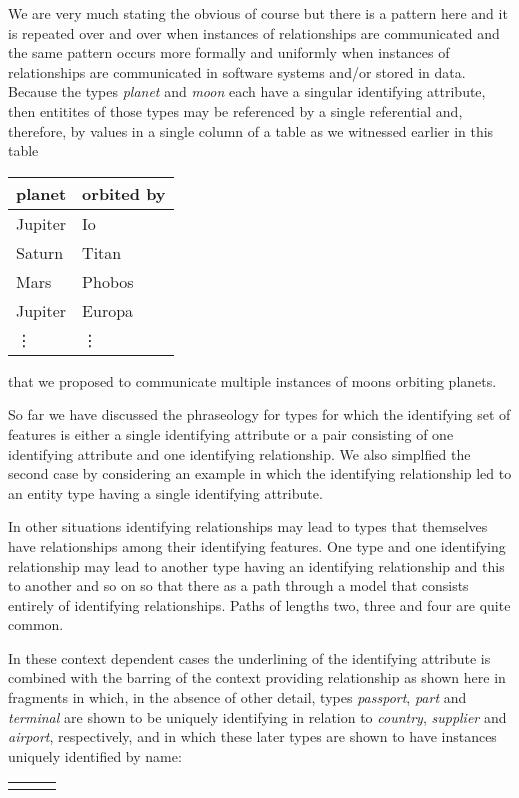 \mynote
We are very much stating the obvious of course but there is a pattern here and it is repeated over and over when instances of relationships are communicated  and the same pattern occurs more formally  and uniformly when instances of relationships are communicated in software systems and/or stored in data.
Because 
the types \textit{planet} and \textit{moon} each have
a singular identifying attribute, then entitites of those types 
may be referenced by a single referential and, therefore, by values in a
single column of a table as we witnessed earlier in this table
\begin{center}
\begin{tabular}{|l | l|}
\hline
planet & orbited by \\
\hline\hline
Jupiter  & Io \\
\hline
Saturn   & Titan    \\
\hline
Mars     & Phobos    \\
\hline
Jupiter  & Europa         \\
\hline
\vdots    & \vdots  \\
\hline
\end{tabular}
\end{center}
that we proposed to communicate multiple instances of moons orbiting planets.

\mynote
So far we have discussed the phraseology for  types for which the identifying set of features is either a single identifying attribute or a pair consisting of one identifying attribute and one identifying relationship. We also simplfied the second case
by considering an example in which the identifying relationship led to an 
entity type having a single identifying attribute. 

In other situations identifying relationships may lead to types that themselves have relationships among their identifying features.
One type and one identifying relationship may lead to another type
having an identifying relationship and this to another and so on so that there as a path through a model that consists entirely of identifying relationships. Paths of lengths two, three and four are quite common.
 

\begin{oldtt}
In these context dependent cases the underlining of the identifying attribute is combined with the barring of the context providing relationship as shown here in fragments in which, in the absence of other detail, types \textit{passport}, \textit{part} and \textit{terminal} are shown to be uniquely identifying  in relation
to \textit{country}, \textit{supplier} and \textit{airport}, respectively, 
and in which these later types are shown to have instances uniquely identified by name:

\begin{tabular} {m{3.5cm} m{3.5cm} m{3.5cm}}
 &
 &

\end{tabular}
\end{oldtt}


